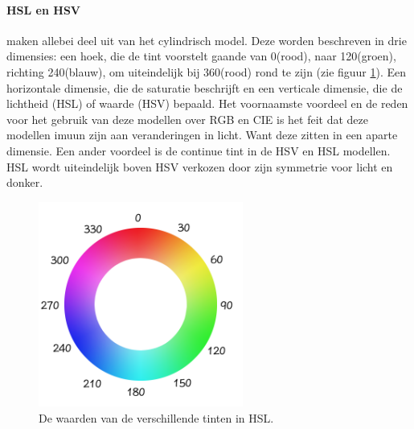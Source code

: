 \paragraph{HSL en HSV} maken allebei deel uit van het cylindrisch model. Deze worden beschreven in drie dimensies: een hoek, die de tint voorstelt gaande van 0\degree (rood), naar 120\degree (groen), richting 240\degree (blauw), om uiteindelijk bij 360\degree (rood) rond te zijn (zie figuur \ref{colorWheel}). Een horizontale dimensie, die de saturatie beschrijft en een verticale dimensie, die de lichtheid (HSL) of waarde (HSV) bepaald. Het voornaamste voordeel en de reden voor het gebruik van deze modellen over RGB en CIE is het feit dat deze modellen imuun zijn aan veranderingen in licht. Want deze zitten in een aparte dimensie. Een ander voordeel is de continue tint in de HSV en HSL modellen. HSL wordt uiteindelijk boven HSV verkozen door zijn symmetrie voor licht en donker. \cite{inbook} \cite{rasouli2017effect}

\begin{figure}[H]
	\center
	\includegraphics[width=0.6\textwidth]{img/hslColorWheel.png}
	\caption{De waarden van de verschillende tinten in HSL. \cite{hslColorWheel}}
	\label{colorWheel}
\end{figure}


